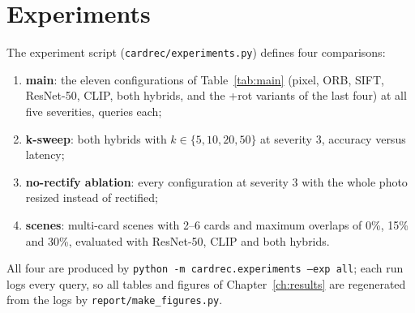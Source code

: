 \section{Experiments}

The experiment script (\texttt{cardrec/experiments.py}) defines four comparisons:
\begin{enumerate}
  \item \textbf{main}: the eleven configurations of Table~\ref{tab:main} (pixel, ORB, SIFT, ResNet-50, CLIP, both hybrids, and the +rot variants of the last four) at all five severities,  queries each;
  \item \textbf{k-sweep}: both hybrids with $k\in\{5, 10, 20, 50\}$ at severity 3, accuracy versus latency;
  \item \textbf{no-rectify ablation}: every configuration at severity 3 with the whole photo resized instead of rectified;
  \item \textbf{scenes}: multi-card scenes with 2--6 cards and maximum overlaps of 0\%, 15\% and 30\%, evaluated with ResNet-50, CLIP and both hybrids.
\end{enumerate}
All four are produced by \texttt{python -m cardrec.experiments --exp all}; each run logs every query, so all tables and figures of Chapter~\ref{ch:results} are regenerated from the logs by \texttt{report/make\_figures.py}.
